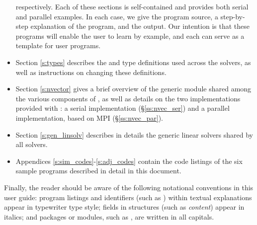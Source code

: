 \begin{itemize}
  respectively. Each of these sections is self-contained and provides both
  serial and parallel examples. In each case, we give the program source, 
  a step-by-step explanation of the program, and the output.  
  Our intention is that these programs will enable the user to learn {\cvodes} 
  by example, and each can serve as a template for user programs.
\item
  Section \ref{s:types} describes the  and  type definitions used 
  across the {\sundials} solvers, as well as instructions on changing these definitions.
\item
  Section \ref{s:nvector} gives a brief overview of the generic {\nvector} module 
  shared among the various components of {\sundials}, as well as details on the two {\nvector}
  implementations provided with {\sundials}: a serial implementation
  (\S\ref{ss:nvec_ser}) and a parallel implementation, based on MPI
  (\S\ref{ss:nvec_par}).
\item
  Section \ref{s:gen_linsolv} describes in details the generic linear solvers shared 
  by all {\sundials} solvers.
\item Appendices \ref{s:sim_codes}-\ref{s:adj_codes} contain the 
  code listings of the six {\cvodes} sample programs described in detail
  in this document.
\end{itemize}

Finally, the reader should be aware of the following notational conventions
in this user guide:  program listings and identifiers (such as ) 
within textual explanations appear in typewriter type style; 
fields in {\C} structures (such as {\em content}) appear in italics;
and packages or modules, such as {\cvdense}, are written in all capitals. 